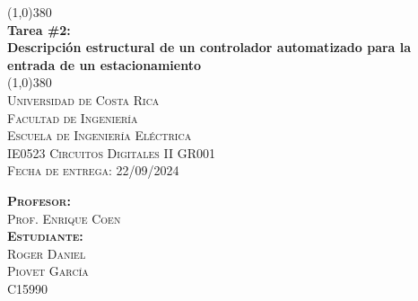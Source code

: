 \begin{titlepage}    
    \begin{center}
        \line(1,0){380}\\
        [5mm]
        \huge{\bfseries 
            Tarea \#2:\\ 
            Descripción estructural de un controlador 
            automatizado para la entrada de un estacionamiento}\\
        \line(1,0){380}\\
        [1.5cm]
        \textsc{\Large 
            Universidad de Costa Rica\\
            Facultad de Ingeniería\\
            Escuela de Ingeniería Eléctrica\\
            IE0523 Circuitos Digitales II GR001\\ \vspace{-0.25cm}
            Fecha de entrega: 22/09/2024}
        \vspace{1.0cm}
        \begin{flushleft}
            \textsc{\large
                \textbf{Profesor:}\\ 
                Prof. Enrique Coen\\[5mm]
                \textbf{Estudiante:}\\ 
                Roger Daniel\\
                Piovet García\\[2mm]
                C15990\\}
        \end{flushleft}
    \end{center}
\end{titlepage}
\restoregeometry

